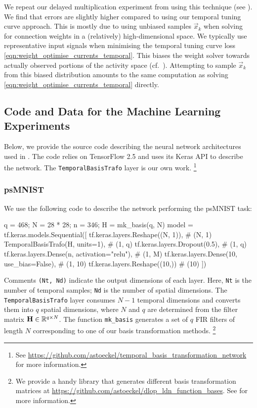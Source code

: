 We repeat our delayed multiplication experiment from  using this technique (see ).
We find that errors are slightly higher compared to using our temporal tuning curve approach.
This is mostly due to using unbiased samples $\vec x_k$ when solving for connection weights in a (relatively) high-dimensional space.
We typically use representative input signals when minimising the temporal tuning curve loss \cref{eqn:weight_optimise_currents_temporal}.
This biases the weight solver towards actually observed portions of the activity space (cf.~).
Attempting to sample $\vec x_k$ from this biased distribution amounts to the same computation as solving \cref{eqn:weight_optimise_currents_temporal} directly.

\subsection{Code and Data for the Machine Learning Experiments}
\label{app:lmu_code}

Below, we provide the source code describing the neural network architectures used in .
The code relies on TensorFlow 2.5 \citep{abadi2016tensorflow} and uses its Keras API \citep{chollet2017deep} to describe the network.
The \texttt{TemporalBasisTrafo} layer is our own work.%
\footnote{See \url{https://github.com/astoeckel/temporal_basis_transformation_network} for more information.}

\subsubsection{psMNIST}

We use the following code to describe the network performing the psMNIST task:
\begin{pythoncode}
q = 468; N = 28 * 28; n = 346; H = mk_basis(q, N)
model = tf.keras.models.Sequential([
  tf.keras.layers.Reshape((N, 1)),             # (N, 1)
  TemporalBasisTrafo(H, units=1),              # (1, q)
  tf.keras.layers.Dropout(0.5),                # (1, q)
  tf.keras.layers.Dense(n, activation="relu"), # (1, M)
  tf.keras.layers.Dense(10, use_bias=False),   # (1, 10)
  tf.keras.layers.Reshape((10,))               # (10)
])
\end{pythoncode}
Comments \texttt{(Nt, Nd)} indicate the output dimensions of each layer.
Here, \texttt{Nt} is the number of temporal samples; \texttt{Nd} is the number of spatial dimensions.
The \texttt{TemporalBasisTrafo} layer consumes $N - 1$ temporal dimensions and converts them into $q$ spatial dimensions, where $N$ and $q$ are determined from the filter matrix $\mathbf{H} \in \mathbb{R}^{q \times N}$.
The function \texttt{mk\_basis} generates a set of $q$ FIR filters of length $N$ corresponding to one of our basis transformation methods.%
\footnote{We provide a handy library that generates different basis transformation matrices at \url{https://github.com/astoeckel/dlop_ldn_function_bases}. See \citet{stockel2021discrete} for more information.}

